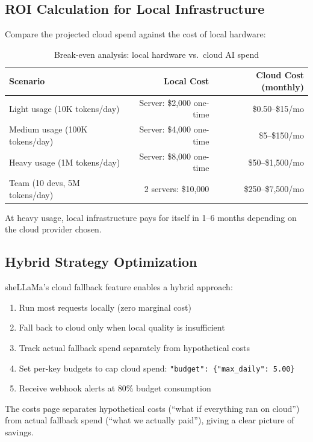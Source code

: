 \documentclass[11pt,a4paper]{article}
\begin{document}
\subsection{ROI Calculation for Local Infrastructure}

Compare the projected cloud spend against the cost of local hardware:

\begin{table}[H]
\centering
\begin{tabularx}{\textwidth}{Xrr}
\toprule
\textbf{Scenario} & \textbf{Local Cost} & \textbf{Cloud Cost (monthly)} \\
\midrule
Light usage (10K tokens/day) & Server: \$2,000 one-time & \$0.50--\$15/mo \\
Medium usage (100K tokens/day) & Server: \$4,000 one-time & \$5--\$150/mo \\
Heavy usage (1M tokens/day) & Server: \$8,000 one-time & \$50--\$1,500/mo \\
Team (10 devs, 5M tokens/day) & 2 servers: \$10,000 & \$250--\$7,500/mo \\
\bottomrule
\end{tabularx}
\caption{Break-even analysis: local hardware vs.\ cloud AI spend}
\end{table}

At heavy usage, local infrastructure pays for itself in 1--6 months depending on the cloud provider chosen.

\subsection{Hybrid Strategy Optimization}

sheLLaMa's cloud fallback feature enables a hybrid approach:

\begin{enumerate}
  \item Run most requests locally (zero marginal cost)
  \item Fall back to cloud only when local quality is insufficient
  \item Track actual fallback spend separately from hypothetical costs
  \item Set per-key budgets to cap cloud spend: \texttt{"budget": \{"max\_daily": 5.00\}}
  \item Receive webhook alerts at 80\% budget consumption
\end{enumerate}

The costs page separates hypothetical costs (``what if everything ran on cloud'') from actual fallback spend (``what we actually paid''), giving a clear picture of savings.
\end{document}
